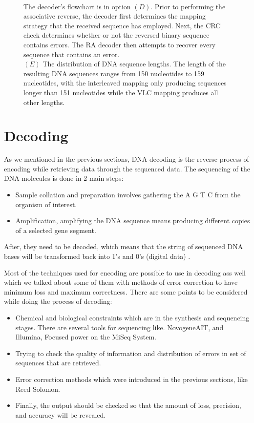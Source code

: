 \documentclass[10pt,twocolumn,twoside]{gsajnl}
\theoremstyle{definition}
\begin{document}
\begin{figure}[htbp]
{\\The decoder's flowchart is in option $(D)$. Prior to performing the associative reverse, the decoder first determines the mapping strategy that the received sequence has employed. Next, the CRC check determines whether or not the reversed binary sequence contains errors. The RA decoder then attempts to recover every sequence that contains an error.
\\$(E)$ The distribution of DNA sequence lengths. The length of the resulting DNA sequences ranges from 150 nucleotides to 159 nucleotides, with the interleaved mapping only producing sequences longer than 151 nucleotides while the VLC mapping produces all other lengths.}
\label{fig10}
\end{figure}

\section{Decoding}
As we mentioned in the previous sections, DNA decoding is the reverse process of encoding while retrieving data through the sequenced data. The sequencing of the DNA molecules is done in 2 main steps:
\begin{itemize}
    \item Sample collation and preparation involves gathering the A G T C from the organism of interest.
    \item Amplification, amplifying the DNA sequence means producing different copies of a selected gene segment.
\end{itemize}
After, they need to be decoded, which means that the string of sequenced DNA bases will be transformed back into 1's and 0's (digital data) \cite{alliance2021preserving}.

Most of the techniques used for encoding are possible to use in decoding ass well which we talked about some of them with methods of error correction to have minimum loss and maximum correctness. There are some points to be considered while doing the process of decoding:
\begin{itemize}
    \item Chemical and biological constraints which are in the synthesis and sequencing stages. There are several tools for sequencing like. NovogeneAIT, and Illumina, Focused power on the MiSeq System.
    \item Trying to check the quality of information and distribution of errors in set of sequences that are retrieved.
    \item Error correction methods which were introduced in the previous sections, like Reed-Solomon.
    \item Finally, the output should be checked so that the amount of loss, precision, and accuracy will be revealed.
\end{itemize}
\end{document}

